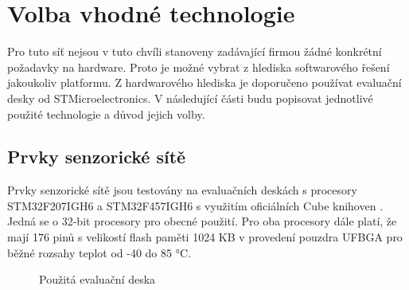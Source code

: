 \chapter{Volba vhodné technologie}
Pro tuto síť nejsou v tuto chvíli stanoveny zadávající firmou žádné konkrétní požadavky na hardware. Proto je možné vybrat z hlediska softwarového řešení jakoukoliv platformu. Z hardwarového hlediska je doporučeno používat evaluační desky od STMicroelectronics. V následující části budu popisovat jednotlivé použité technologie a důvod jejich volby.

\section{Prvky senzorické sítě}
Prvky senzorické sítě jsou testovány na evaluačních deskách s procesory STM32F207IGH6 a STM32F457IGH6 s využitím oficiálních Cube knihoven \cite{cube}. Jedná se o 32-bit procesory pro obecné použití. Pro oba procesory dále platí, že mají 176 pinů s velikostí flash paměti 1024 KB v provedení pouzdra UFBGA pro běžné rozsahy teplot od -40 do 85 °C.

\begin{figure}[h]
    \centering
	\caption{Použitá evaluační deska}
	\label{fig:eval-board}
\end{figure}

